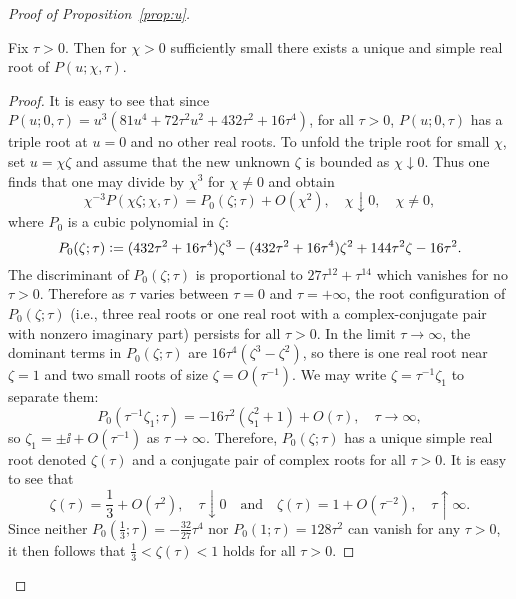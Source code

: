 \begin{proof}[Proof of Proposition~\ref{prop:u}]
\begin{lemma}
Fix $\tau>0$.  Then for $\chi>0$ sufficiently small there exists a unique and simple real root of $P(u;\chi,\tau)$.
\label{lem:chi-small}
\end{lemma}
\begin{proof}
It is easy to see that since $P(u;0,\tau)=u^3(81u^4+72\tau^2u^2 + 432\tau^2+16\tau^4)$, for all $\tau>0$, $P(u;0,\tau)$ has a triple root at $u=0$ and no other real roots.  To unfold the triple root for small $\chi$, set $u=\chi \zeta$ and assume that the new unknown $\zeta$ is bounded as $\chi\downarrow 0$.  Thus one finds that one may divide by $\chi^3$ for $\chi\neq 0$ and obtain
\begin{equation}
\chi^{-3}P(\chi \zeta;\chi,\tau)=P_0(\zeta;\tau) + O(\chi^2),\quad\chi\downarrow 0,\quad \chi\neq 0,
\end{equation}
where $P_0$ is a cubic polynomial in $\zeta$:
\begin{equation}
P_0(\zeta;\tau)\vcentcolon= (432\tau^2+16\tau^4)\zeta^3-(432\tau^2+16\tau^4)\zeta^2+144\tau^2\zeta-16\tau^2.
\end{equation}
The discriminant of $P_0(\zeta;\tau)$ is proportional to $27\tau^{12}+\tau^{14}$ which vanishes for no $\tau>0$.  Therefore as $\tau$ varies between $\tau=0$ and $\tau=+\infty$, the root configuration of $P_0(\zeta;\tau)$ (i.e., three real roots or one real root with a complex-conjugate pair with nonzero imaginary part) persists for all $\tau>0$.  In the limit $\tau\to\infty$, the dominant terms in $P_0(\zeta;\tau)$ are $16\tau^4(\zeta^3-\zeta^2)$, so there is one real root near $\zeta=1$ and two small roots of size $\zeta=O(\tau^{-1})$.  We may write $\zeta=\tau^{-1}\zeta_1$ to separate them:
\begin{equation}
P_0(\tau^{-1}\zeta_1;\tau)=-16\tau^2(\zeta_1^2+1)+O(\tau),\quad\tau\to\infty,
\end{equation}
so $\zeta_1=\pm\ii + O(\tau^{-1})$ as $\tau\to\infty$.  Therefore, $P_0(\zeta;\tau)$ has a unique simple real root denoted $\zeta(\tau)$ and a conjugate pair of complex roots for all $\tau>0$.  It is easy to see that
\begin{equation}
\zeta(\tau)=\frac{1}{3}+O(\tau^2),\quad\tau\downarrow 0\quad\text{and}\quad
\zeta(\tau)=1+O(\tau^{-2}),\quad\tau\uparrow\infty.
\end{equation}
Since neither $P_0(\tfrac{1}{3};\tau)=-\tfrac{32}{27}\tau^4$ nor $P_0(1;\tau)=128\tau^2$ can vanish for any $\tau>0$, it then follows that $\tfrac{1}{3}<\zeta(\tau)<1$ holds for all $\tau>0$.  

\end{proof}
\end{proof}

